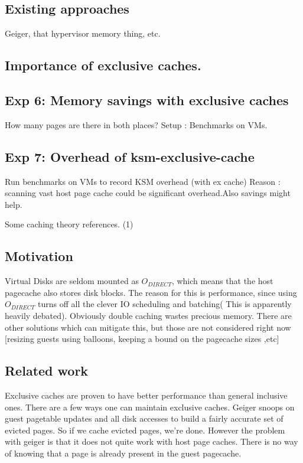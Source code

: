 \documentclass[10pt,a4paper]{article}
\begin{document}
\subsection{Existing approaches}

Geiger, that hypervisor memory thing, etc.
\subsection{Importance of exclusive caches.}

\subsection{Exp 6: Memory savings with exclusive caches}

How many pages are there in both places?
Setup : Benchmarks on VMs.

\subsection{Exp 7: Overhead of ksm-exclusive-cache}

Run benchmarks on VMs to record KSM overhead (with ex cache)
Reason : scanning vast host page cache could be significant overhead.Also savings might help.

Some caching theory references.
(1)
\subsection{Motivation}

 Virtual Disks are seldom mounted as $O_{DIRECT}$, which means that the  host pagecache also stores disk blocks. The reason for this is performance,  since using $O_{DIRECT}$ turns off all the clever IO scheduling and batching( This is apparently heavily debated).
Obviously double caching wastes precious memory. There are other solutions which can mitigate this, but those are not considered right now [resizing guests using balloons, keeping a bound on the pagecache sizes ,etc]

\subsection{Related work}

Exclusive caches are proven to have better performance than  general inclusive ones. There are a few ways one can maintain exclusive caches. 
Geiger snoops on guest pagetable updates  and all disk accesses to build a  fairly accurate set of evicted pages. So if we cache evicted pages, we're done. However the problem with geiger is that it does not quite work with host page caches. There is no way of knowing that a page is already present in the guest pagecache. 
\end{document}
